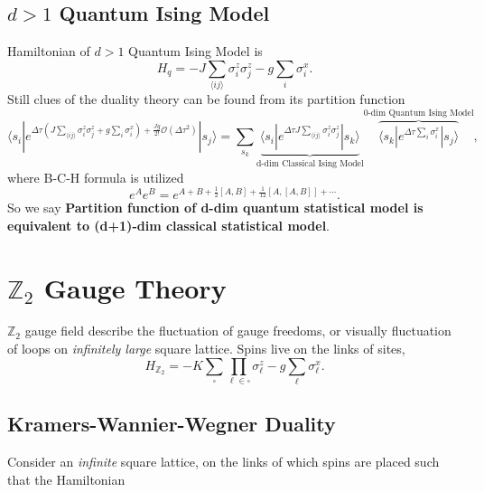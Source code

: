 \documentclass[10pt,nofootinbib]{revtex4}
\numberwithin{equation}{section}
\begin{document}
	\subsection{$d>1$ Quantum Ising Model}
		Hamiltonian of $d>1$ Quantum Ising Model is
		\begin{equation}\label{1.2.1}
			H_q=-J\sum_{\langle ij\rangle}\sigma_i^z\sigma_j^z-g\sum_i\sigma_i^x.
		\end{equation}
		Still clues of the duality theory can be found from its partition function
		\begin{equation}\label{1.2.2}
			\langle s_i|e^{\Delta\tau(J\sum_{\langle ij\rangle}\sigma_i^z\sigma_j^z+g\sum_i\sigma_i^x)+\frac{Jg}{2!}\mathcal{O}(\Delta\tau^2)}|s_j\rangle=\sum_{s_k}\underbrace{\langle s_i|e^{\Delta\tau J\sum_{\langle ij\rangle}\sigma_i^z\sigma_j^z}|s_k\rangle}_{\text{d-dim Classical Ising Model}}\overbrace{\langle s_k|e^{\Delta\tau\sum_i\sigma_i^x}|s_j\rangle}^{\text{0-dim  Quantum Ising Model}},
		\end{equation}
		where B-C-H formula is utilized
		\begin{equation*}
			e^{A}e^B=e^{A+B+\frac12[A,B]+\frac{1}{12}[A,[A,B]]+\cdots}.
		\end{equation*}
		So we say \cite{hsieh2016d} {\color{red}\textbf{Partition function of d-dim quantum statistical model is equivalent to (d+1)-dim classical statistical model}}.

\section{$\mathbb{Z}_2$ Gauge Theory}
	$\mathbb{Z}_2$ gauge field describe the fluctuation of gauge freedoms, or visually fluctuation of loops on \emph{infinitely large} square lattice. Spins live on the links of sites, 
	\begin{equation}\label{2.1.1}
		H_{\mathbb{Z}_2}=-K\sum_\square\prod_{\ell\in\square}\sigma_\ell^z-g\sum_\ell\sigma_\ell^x.
	\end{equation}
	\subsection{Kramers-Wannier-Wegner Duality}
		Consider an \emph{infinite} square lattice, on the links of which spins are placed such that the Hamiltonian


\end{document}
